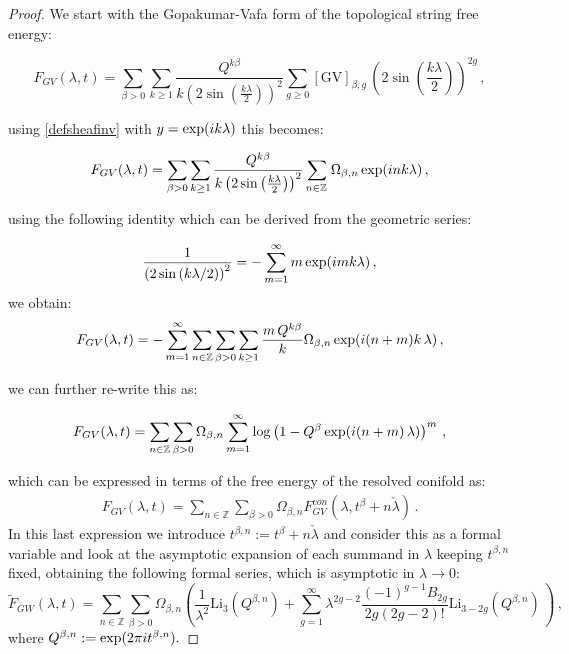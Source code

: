 \documentclass[a4paper,12pt,justification=centering]{article}
\numberwithin{equation}{section}
\newcommand{\ii}{\textnormal{i}}
\theoremstyle{plain}%
\theoremstyle{definition}
\begin{document}
\begin{proof}





We start with the Gopakumar-Vafa form of the topological string free energy:

\begin{equation}
F_{GV}(\lambda,t)= \sum_{\beta>0} \sum_{k\ge 1}  \frac{Q^{k\beta}}{k \left( 2 \sin \left( \frac{k\lambda}{2}\right)\right)^{2}}  \sum_{g\ge 0} [\textrm{GV}]_{\beta,g}\, \left( 2 \sin \left( \frac{k\lambda}{2}\right)\right)^{2g} \,,
\end{equation}

using \eqref{defsheafinv} with $y=\exp(\ii k\lambda)$ this becomes:

\begin{equation}\label{eq:GVinTermsofOmega}
F_{GV}(\lambda,t)= \sum_{\beta>0} \sum_{k\ge 1}  \frac{Q^{k\beta}}{k \left( 2 \sin \left( \frac{k\lambda}{2}\right)\right)^{2}} \sum_{n\in \mathbb{Z}\,} \Omega_{\beta,n} \exp(\ii  n k\lambda) \,,
\end{equation}

using the following identity which can be derived from the geometric series:

\begin{equation}
\frac{1}{\left( 2\sin \left(k\lambda/2\right)\right)^2} = -\sum_{m=1}^{\infty} m \exp(\ii m k \lambda)\,,
\end{equation}
we obtain:
\begin{equation}
F_{GV}(\lambda,t)=- \sum_{m=1}^{\infty} \sum_{n\in \mathbb{Z}} \sum_{\beta>0} \sum_{k\ge 1}  \frac{m\, Q^{k\beta}}{k} \Omega_{\beta,n}  \exp(\ii (n+m) k\,\lambda) \,,
\end{equation}

we can further re-write this as:

\begin{equation}
F_{GV}(\lambda,t)=  \sum_{n\in \mathbb{Z}}  \sum_{\beta>0}   \Omega_{\beta,n}  \sum_{m=1}^{\infty} \log\left(1-   Q^{\beta}   \exp(\ii (n+m) \,\lambda) \right)^m  \,,
\end{equation}

which can be expressed in terms of the free energy of the resolved conifold as:
\begin{align}
F_{GV}(\lambda,t)=  \sum_{n\in \mathbb{Z}}  \sum_{\beta>0}   \Omega_{\beta,n} F_{GV}^{con} (\lambda, t^{\beta}+ n \check{\lambda}) \, .
\end{align}
In this last expression we introduce $t^{\beta,n}:=  t^{\beta}+ n \check{\lambda}$ and consider this as a formal variable and look at the asymptotic expansion of each summand in $\lambda$ keeping $t^{\beta,n}$ fixed, obtaining  the following formal series, which is asymptotic in $\lambda\rightarrow 0$:
\begin{equation}
\tilde{F}_{GW}(\lambda,t)=  \sum_{n\in \mathbb{Z}}  \sum_{\beta>0}   \Omega_{\beta,n}  \left( \frac{1}{\lambda^2} \mathrm{Li}_{3}(Q^{\beta,n})+ \sum_{g=1}^{\infty} \lambda^{2g-2} \frac{(-1)^{g-1}B_{2g}}{2g (2g-2)!} \mathrm{Li}_{3-2g} (Q^{\beta,n}) \, \right)\,,
\end{equation}
where $Q^{\beta,n}:=\exp(2\pi \ii t^{\beta,n}).$



\end{proof}
\end{document}
